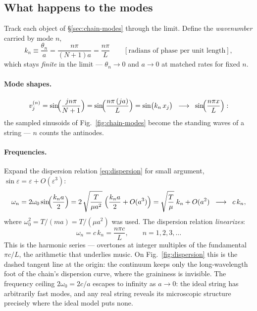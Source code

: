 \documentclass[11pt]{article}
\theoremstyle{plain}
\theoremstyle{definition}
\theoremstyle{remark}
\begin{document}
\subsection{What happens to the modes}

Track each object of \S\ref{sec:chain-modes} through the limit. Define the
\emph{wavenumber} carried by mode $n$,
\begin{equation}
  k_n \equiv \frac{\theta_n}{a} = \frac{n\pi}{(N+1)a} = \frac{n\pi}{L}
  \qquad [\text{radians of phase per unit length}],
\end{equation}
which stays \emph{finite} in the limit --- $\theta_n \to 0$ and $a\to0$ at
matched rates for fixed $n$.

\paragraph{Mode shapes.}
\begin{equation}
  v^{(n)}_j = \sin\!\Bigl(\frac{jn\pi}{N+1}\Bigr)
  = \sin\!\Bigl(\frac{n\pi\, (ja)}{L}\Bigr)
  = \sin\bigl(k_n\, x_j\bigr)
  \;\;\longrightarrow\;\;
  \sin\!\Bigl(\frac{n\pi x}{L}\Bigr) :
\end{equation}
the sampled sinusoids of Fig.~\ref{fig:chain-modes} become the standing
waves of a string --- $n$ counts the antinodes.

\paragraph{Frequencies.}
Expand the dispersion relation \eqref{eq:dispersion} for small argument,
$\sin\varepsilon = \varepsilon + O(\varepsilon^3)$:
\begin{equation}
  \omega_n
  = 2\omega_0 \sin\!\Bigl(\frac{k_n a}{2}\Bigr)
  = 2\,\sqrt{\frac{T}{\mu a^2}}\;
    \Bigl(\frac{k_n a}{2} + O(a^3)\Bigr)
  = \sqrt{\frac{T}{\mu}}\;k_n + O(a^2)
  \;\;\longrightarrow\;\;
  c\,k_n ,
\end{equation}
where $\omega_0^2 = T/(ma) = T/(\mu a^2)$ was used. The dispersion relation
\emph{linearizes}:
\begin{equation}
  \boxed{\;
  \omega_n = c\,k_n = \frac{n\pi c}{L},
  \qquad n = 1, 2, 3, \dots
  \;}
\end{equation}
This is the harmonic series --- overtones at integer multiples of the
fundamental $\pi c/L$, the arithmetic that underlies music. On
Fig.~\ref{fig:dispersion} this is the dashed tangent line at the origin: the
continuum keeps only the long-wavelength foot of the chain's dispersion
curve, where the graininess is invisible. The frequency ceiling $2\omega_0 =
2c/a$ escapes to infinity as $a\to0$: the ideal string has arbitrarily fast
modes, and any real string reveals its microscopic structure precisely where
the ideal model puts none.
\end{document}

